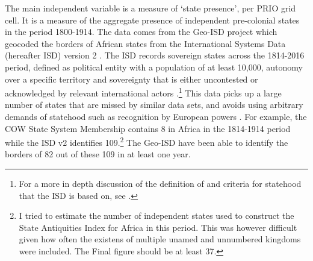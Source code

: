 \documentclass[12pt]{article}
\begin{document}
The main independent variable is a measure of `state presence', per PRIO grid
cell. It is a measure of the aggregate presence of independent pre-colonial
states in the period 1800-1914. The data comes from the Geo-ISD project which
geocoded the borders of African states from the International Systems Data
(hereafter ISD) version 2 \citep{Butcher2020}. The ISD records sovereign states
across the 1814-2016 period, defined as political entity with a population of at
least 10,000, autonomy over a specific territory and sovereignty that is either
uncontested or acknowledged by relevant international actors
\citep{Butcher2020}.\footnote{For a more in depth discussion of the definition
	of and criteria for statehood that the ISD is based on, see
\citet{Butcher2017}.} This data picks up a large number of states that are
missed by similar data sets, and avoids using arbitrary demands of statehood
such as recognition by European powers \citep{Butcher2020}.  For example, the
COW State System Membership contains 8 in Africa in the 1814-1914 period while
the ISD v2 identifies 109.\footnote{I tried to estimate the number of
	independent states used to construct the State Antiquities Index for
Africa in this period. This was however difficult given how often the existens
of multiple unamed and unnumbered kingdoms were included. The Final figure
should be at least 37.} The Geo-ISD have been able to identify the borders of 82
out of these 109 in at least one year.
\end{document}
